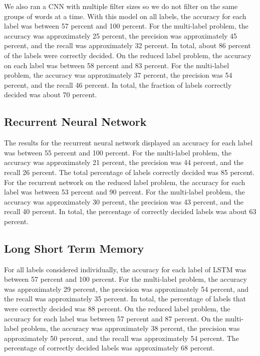 \documentclass[sigconf]{acmart}
\begin{document}
We also ran a CNN with multiple filter sizes so we do not filter on the same groups of words at a time. With this model on all labels, the accuracy for each label was between 57 percent and 100 percent. For the multi-label problem, the accuracy was approximately 25 percent, the precision was approximately 45 percent, and the recall was approximately 32 percent. In total, about 86 percent of the labels were correctly decided. On the reduced label problem, the accuracy on each label was between 58 percent and 83 percent. For the multi-label problem, the accuracy was approximately 37 percent, the precision was 54 percent, and the recall 46 percent. In total, the fraction of labels correctly decided was about 70 percent. 

\subsection{Recurrent Neural Network}
The results for the recurrent neural network displayed an accuracy for each label was between 55 percent and 100 percent. For the multi-label problem, the accuracy was approximately 21 percent, the precision was 44 percent, and the recall 26 percent. The total percentage of labels correctly decided was 85 percent. For the recurrent network on the reduced label problem, the accuracy for each label was between 53 percent and 90 percent. For the multi-label problem, the accuracy was approximately 30 percent, the precision was 43 percent, and the recall 40 percent. In total, the percentage of correctly decided labels was about 63 percent.

\subsection{Long Short Term Memory}
For all labels considered individually, the accuracy for each label of LSTM was between 57 percent and 100 percent. For the multi-label problem, the accuracy was approximately 29 percent, the precision was approximately 54 percent, and the recall was approximately 35 percent. In total, the percentage of labels that were correctly decided was 88 percent. On the reduced label problem, the accuracy for each label was between 57 percent and 87 percent. On the multi-label problem, the accuracy was approximately 38 percent, the precision was approximately 50 percent, and the recall was approximately 54 percent. The percentage of correctly decided labels was approximately 68 percent.
\end{document}
